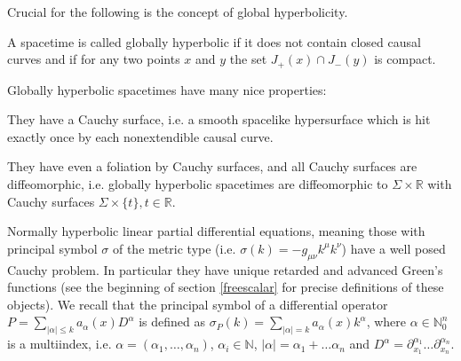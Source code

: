 \documentclass[11pt]{article}
\newcommand{\NN}{\mathbb{N}}          %
\newcommand{\RR}{\mathbb{R}}           %
\newcommand{\al}{\alpha}
\newcommand{\1}{\mathds{1}}                         %
\begin{document}
Crucial for the following is the concept of global hyperbolicity.

{\begin{df} A spacetime is called globally hyperbolic if it does not contain closed causal curves and if for any two points $x$ and $y$ the set $J_+(x)\cap J_-(y)$ is compact.
\end{df}}


{Globally hyperbolic spacetimes have many nice properties: }
\begin{itemize}

{\item They have a Cauchy surface, i.e. a smooth spacelike hypersurface which is hit exactly once by each nonextendible causal curve.}

{\item They have even a foliation by Cauchy surfaces, and all Cauchy surfaces are diffeomorphic, i.e. globally hyperbolic spacetimes are diffeomorphic to $\Sigma\times\RR$ with Cauchy surfaces $\Sigma\times\{t\},t\in\RR$.}

\item  Normally hyperbolic linear partial differential equations, meaning those with principal symbol $\sigma$ of the metric type (i.e. $\sigma(k)=-g_{\mu\nu}k^\mu k^\nu$) have a well posed Cauchy problem. In particular they have unique retarded and advanced Green's functions (see the beginning of section \ref{freescalar} for precise definitions of these objects). We recall that the principal symbol of a differential operator $P=\sum_{|\al|\leq k}a_\al(x)D^\al$ is defined as $\sigma_P(k)=\sum_{|\al|= k}a_\al(x)k^\al$, where $\al\in \mathbb{N}^n_0$ is a multiindex, i.e. $\alpha = (\alpha_1, \ldots,\alpha_n)$, $\al_i\in\NN$, $|\al|=\al_1+\ldots\al_n$  and $D^\al=\partial_{x_1}^{\alpha_1} \ldots \partial_{x_n}^{\alpha_n}$.
\end{itemize}
\end{document}
